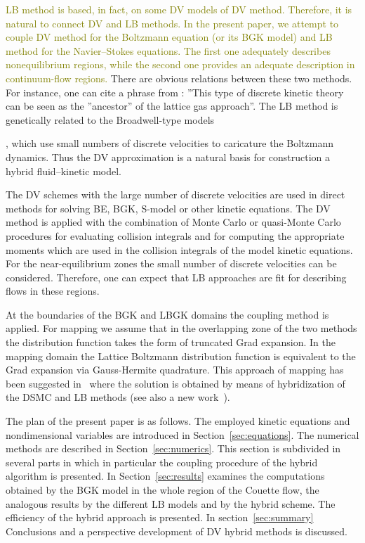 \documentclass[]{elsarticle} %
\newcommand{\todo}[1]{\textcolor{olive}{#1}}
\begin{document}
\todo{LB method is based, in fact, on some DV models of DV method. Therefore, it is natural to connect DV and LB methods. In the present paper, we attempt to couple DV method for the Boltzmann equation (or its BGK model) and LB method for the Navier--Stokes equations. The first one adequately describes nonequilibrium regions, while the second one provides an adequate description in continuum-flow regions.} There are obvious relations between these two methods. For instance, one can cite a phrase from \cite{Rivet2001}: ''This type of discrete kinetic theory can be seen as the ''ancestor'' of the lattice gas approach''. The LB method is genetically related to the Broadwell-type models~{\cite{Broadwell1964shock, Gatignol1975}, which use small numbers of discrete velocities to caricature the Boltzmann dynamics. Thus the DV approximation is a natural basis for construction a hybrid fluid--kinetic model.

The DV schemes with the large number of discrete velocities are used in direct methods for solving BE, BGK, S-model or other kinetic equations. The DV method is applied with the combination of Monte Carlo or quasi-Monte Carlo procedures for evaluating collision integrals and for computing the appropriate moments which are used in the collision integrals of the model kinetic equations. For the near-equilibrium zones the small number of discrete velocities can be considered. Therefore, one can expect that LB approaches are fit for describing flows in these regions.

At the boundaries of the BGK and LBGK domains the coupling method is applied. For mapping we assume that in the overlapping zone of the two methods the distribution function takes the form of truncated Grad expansion. In the mapping domain the Lattice Boltzmann distribution function is equivalent to the Grad expansion via Gauss-Hermite quadrature. This approach of mapping has been suggested in~\cite{Staso2016short, Staso2016long} where the solution is obtained by means of hybridization of the DSMC and LB methods (see also a new work~\cite{Staso2018}).

The plan of the present paper is as follows.
The employed kinetic equations and nondimensional variables are introduced in Section~\ref{sec:equations}.
The numerical methods are described in Section~\ref{sec:numerics}.
This section is subdivided in several parts in which in particular the coupling procedure of the hybrid algorithm is presented.
In Section~\ref{sec:results} examines the computations obtained by the BGK model in the whole region of the Couette flow, the analogous results by the different LB models and by the hybrid scheme. The efficiency of the hybrid approach is presented.
In section~\ref{sec:summary} Conclusions and a perspective development of DV hybrid methods is discussed.


}
\end{document}
